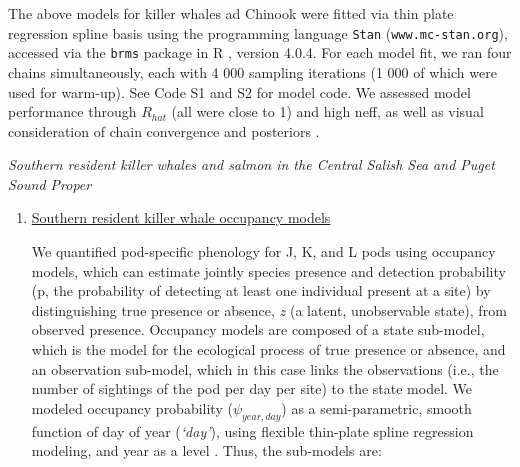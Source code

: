 \documentclass{article}
\begin{document}
The above models for killer whales ad Chinook were fitted via thin plate regression spline basis using the programming language \texttt{Stan} \citep{Carpenter:2016aa} (\texttt{www.mc-stan.org}), accessed via the \texttt{brms}\citep{brms2018} package in R \citep{Rcore2021}, version 4.0.4. For each model fit, we ran four chains simultaneously, each with 4 000 sampling iterations (1 000 of which were used for warm-up). See Code S1 and S2 for model code. We assessed model performance through $R_{hat}$ (all were close to 1) and high neff, as well as visual consideration of chain convergence and posteriors \citep{BDA}.
\par \emph{Southern resident killer whales and salmon in the Central Salish Sea and Puget Sound Proper}
\begin{enumerate}
\item \underline {Southern resident killer whale occupancy models}
\par We quantified pod-specific phenology for J, K, and L pods using occupancy models, which can estimate jointly species presence and detection probability (p, the probability of detecting at least one individual present at a site) by distinguishing true presence or absence, \emph{z} (a latent, unobservable state), from observed presence. Occupancy models are composed of a state sub-model, which is the model for the ecological process of true presence or absence, and an observation sub-model, which in this case links the observations (i.e., the number of sightings of the pod per day per site) to the state model. We modeled occupancy probability ($\psi_{year,day}$) as a semi-parametric, smooth function of day of year (\emph{`day'}), using flexible thin-plate spline regression modeling, and year as a level \citep{strebel2014}. Thus, the sub-models are:


\end{enumerate}
\end{document}
